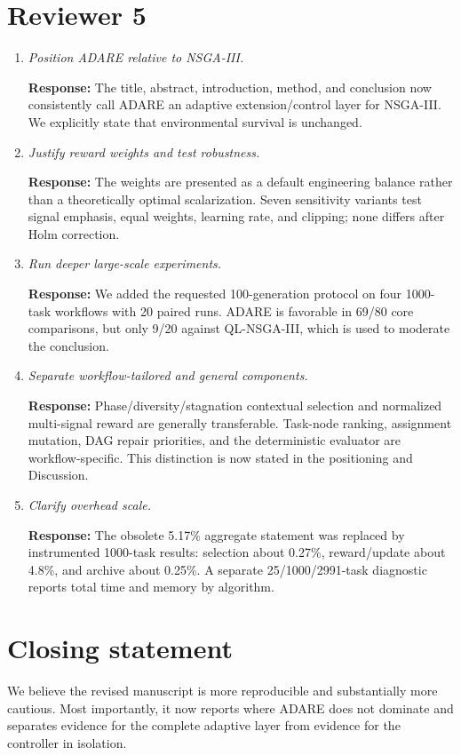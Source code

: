 \documentclass[11pt]{article}
\newcommand{\response}[1]{\par\smallskip\noindent\textcolor{blue!55!black}{\textbf{Response:} #1}\par\medskip}
\begin{document}
\section*{Reviewer 5}
\begin{enumerate}
\item \emph{Position ADARE relative to NSGA-III.}
\response{The title, abstract, introduction, method, and conclusion now consistently call ADARE an adaptive extension/control layer for NSGA-III. We explicitly state that environmental survival is unchanged.}

\item \emph{Justify reward weights and test robustness.}
\response{The weights are presented as a default engineering balance rather than a theoretically optimal scalarization. Seven sensitivity variants test signal emphasis, equal weights, learning rate, and clipping; none differs after Holm correction.}

\item \emph{Run deeper large-scale experiments.}
\response{We added the requested 100-generation protocol on four 1000-task workflows with 20 paired runs. ADARE is favorable in 69/80 core comparisons, but only 9/20 against QL-NSGA-III, which is used to moderate the conclusion.}

\item \emph{Separate workflow-tailored and general components.}
\response{Phase/diversity/stagnation contextual selection and normalized multi-signal reward are generally transferable. Task-node ranking, assignment mutation, DAG repair priorities, and the deterministic evaluator are workflow-specific. This distinction is now stated in the positioning and Discussion.}

\item \emph{Clarify overhead scale.}
\response{The obsolete 5.17\% aggregate statement was replaced by instrumented 1000-task results: selection about 0.27\%, reward/update about 4.8\%, and archive about 0.25\%. A separate 25/1000/2991-task diagnostic reports total time and memory by algorithm.}
\end{enumerate}

\section*{Closing statement}
We believe the revised manuscript is more reproducible and substantially more cautious. Most importantly, it now reports where ADARE does not dominate and separates evidence for the complete adaptive layer from evidence for the controller in isolation.
\end{document}
